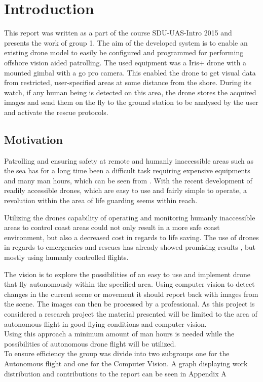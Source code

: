 \chapter*{Introduction}

This report was written as a part of the course  SDU-UAS-Intro 2015 and presents the work of group 1. 
The aim of the developed system is to enable an existing drone model to easily be configured and programmed for performing offshore vision aided patrolling. 
The used equipment was a Iris+ drone with a mounted gimbal with a go pro camera. This enabled the drone to get visual data from restricted, user-specified areas at some distance from the shore. 
During its watch, if any human being is detected on this area, the drone stores the acquired images and send them on the fly to the ground station to be analysed by the user and activate the rescue protocols. 



\section*{Motivation}
Patrolling and ensuring safety at remote and humanly inaccessible areas such as the sea has for a long time been a difficult task requiring expensive equipments and many man hours, which can be seen from \cite{Ref:Drone2}. With the recent development of readily accessible drones, which are easy to use and fairly simple to operate, a revolution within the area of life guarding seems within reach. 

Utilizing the drones capability of operating and monitoring humanly inaccessible areas to control coast areas could not only result in a more safe coast environment, but also a decreased cost in regards to life saving. The use of drones in regards to emergencies and rescues has already showed promising results \cite{Ref:Drone1} \cite{Ref:Drone3} \cite{Ref:Drone4} \cite{Ref:DroneResearch1} \cite{Ref:DroneResearch1}, but mostly using humanly controlled flights.

The vision is to explore the possibilities of an easy to use and implement drone that fly autonomously within the specified area. Using computer vision to detect changes in the current scene or movement it should report back with images from the scene. The images can then be processed by a professional. As this project is considered a research project the material presented will be limited to the area of autonomous flight in good flying conditions and computer vision.\\ 
Using this approach a minimum amount of man hours is needed while the possibilities of autonomous drone flight will be utilized.\\
To ensure efficiency the group was divide into two subgroups one for the Autonomous flight and one for the Computer Vision. A graph displaying work distribution and contributions to the report can be seen in Appendix A

